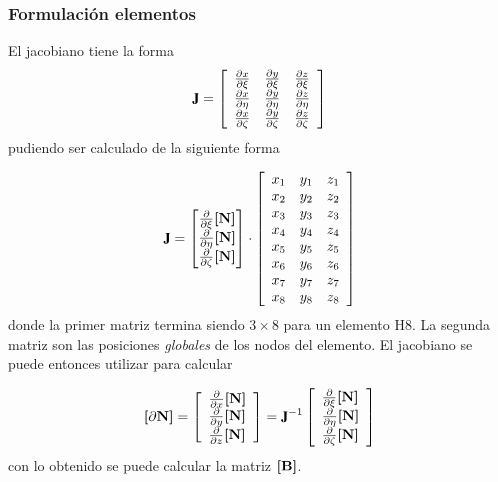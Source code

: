 \subsubsection*{Formulación elementos}
El jacobiano tiene la forma
\[
\jac=
\left[\begin{array}{lll}\spartial{x}{\xi} & \spartial{y}{\xi}  & \spartial{z}{\xi}  \\ \spartial{x}{\eta}  &\spartial{y}{\eta}  &\spartial{z}{\eta} \\\spartial{x}{\zeta} & \spartial{y}{\zeta} &\spartial{z}{\zeta}\end{array}\right]
\]
pudiendo ser calculado de la siguiente forma

\begin{equation}
	\jac = \begin{bmatrix}
	\frac{\partial}{\partial \xi} \MN \\
	\frac{\partial}{\partial \eta} \MN \\
	\frac{\partial}{\partial \zeta} \MN 
	\end{bmatrix}
	\cdot 
\left[\begin{array}{lll}{x_{1}} & {y_{1}} & {z_{1}} \\ {x_{2}} & {y_{2}} & {z_{2}} \\ {x_{3}} & {y_{3}} & {z_{3}} \\ {x_{4}} & {y_{4}} & {z_{4}} \\ {x_{5}} & {y_{5}} & {z_{5}} \\ {x_{6}} & {y_{6}} & {z_{6}} \\ {x_{7}} & {y_{7}} & {z_{7}} \\ {x_{8}} & {y_{8}} & {z_{8}}\end{array}\right]
\end{equation}
donde la primer matriz termina siendo $3\times8$ para un elemento H8. La segunda matriz son las posiciones \textit{globales} de los nodos del elemento. El jacobiano se puede entonces utilizar para calcular

\begin{equation}
	\Mme{\partial N}=\left[\begin{array}{l} \frac{\partial}{\partial x}\MN  \\ \frac{\partial}{\partial y} \MN  \\ \frac{\partial}{\partial z} \MN  \end{array}\right]=\jac^{-1}\left[\begin{array}{l}\frac{\partial}{\partial \xi} \MN \\
	\frac{\partial}{\partial \eta} \MN \\ 
	\frac{\partial}{\partial \zeta} \MN \end{array}\right]
\end{equation}
con lo obtenido se puede calcular la matriz $\boldsymbol{[}\mathbf{B} \boldsymbol{]}$.

